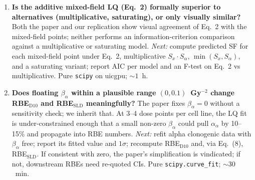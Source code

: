 \begin{enumerate}
\item \textbf{Is the additive mixed-field LQ (Eq.~2) formally superior to
alternatives (multiplicative, saturating), or only visually similar?}
Both the paper and our replication show visual agreement of Eq.~2 with
the mixed-field points; neither performs an information-criterion
comparison against a multiplicative or saturating model.
\emph{Next:} compute predicted SF for each mixed-field point under Eq.~2,
multiplicative $S_x \cdot S_\alpha$, $\min(S_x, S_\alpha)$, and a
saturating variant; report AIC per model and an F-test on Eq.~2 vs
multiplicative. Pure \texttt{scipy} on uicgpu; $\sim 1$~h.

\item \textbf{Does floating $\beta_\alpha$ within a plausible range
$(0, 0.1)$~Gy$^{-2}$ change RBE$_{\text{D10}}$ and RBE$_{\text{SLD}}$
meaningfully?}
The paper fixes $\beta_\alpha = 0$ without a sensitivity check; we
inherit that. At 3--4 dose points per cell line, the LQ fit is
under-constrained enough that a small non-zero $\beta_\alpha$ could pull
$\alpha_\alpha$ by 10--15\% and propagate into RBE numbers.
\emph{Next:} refit alpha clonogenic data with $\beta_\alpha$ free; report
its fitted value and $1\sigma$; recompute RBE$_{\text{D10}}$ and, via
Eq.~(8), RBE$_{\text{SLD}}$. If consistent with zero, the paper's
simplification is vindicated; if not, downstream RBEs need re-quoted CIs.
Pure \texttt{scipy.curve\_fit}; $\sim 30$~min.
\end{enumerate}
